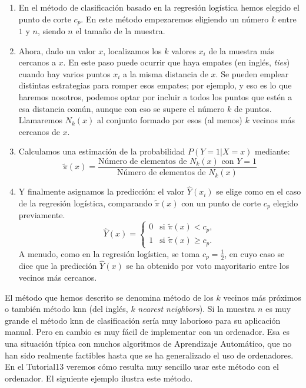 \begin{enumerate}
	\item En el método de clasificación basado en la regresión logística  hemos elegido el punto de corte $c_p$. En este método empezaremos eligiendo un número $k$ entre $1$ y $n$, siendo $n$ el tamaño de la muestra.
	
	\item Ahora, dado un valor $x$, localizamos los $k$ valores $x_i$ de la muestra más cercanos a $x$. En este paso puede ocurrir que haya {\sf empates} (en inglés, {\em ties}) cuando hay varios puntos $x_i$ a la misma distancia de $x$. Se pueden emplear distintas estrategias para romper esos empates; por ejemplo, y eso es lo que haremos nosotros, podemos optar por incluir a todos los puntos que estén a esa distancia común, aunque con eso se supere el número $k$ de puntos. Llamaremos $N_k(x)$ al conjunto formado por esos (al menos) $k$ vecinos más cercanos de $x$.

	\item Calculamos una estimación de la probabilidad $P(Y=1|X=x)$ mediante:
	\[
	\tilde{\pi}(x) =
	\dfrac{
		\mbox{Número de elementos de $N_k(x)$ con $Y=1$}
	}{
	\mbox{Número de elementos de $N_k(x)$}
	}
	\]
		
	\item Y finalmente asignamos la predicción: el valor $\hat{Y}(x_i)$ se elige como en el caso de la regresión logística, comparando $\tilde{\pi}(x)$  con un punto de corte $c_p$ elegido previamente.
	\[
	\hat Y(x) =
	\begin{cases}
	0 &\mbox{si } \tilde{\pi}(x) < c_p,\\[3mm]
	1 &\mbox{si } \tilde{\pi}(x) \geq c_p.
	\end{cases}
	\]
	A menudo, como en la regresión logística, se toma $c_p= \frac{1}{2}$, en cuyo caso se dice que la predicción $\hat{Y}(x)$ se ha obtenido por voto mayoritario entre los vecinos más cercanos.

\end{enumerate}
El método que hemos descrito se denomina {\sf método de los $k$ vecinos más próximos} o también {\sf método knn} (del inglés, $k$ {\em nearest neighbors}). Si la muestra $n$ es muy grande el método knn de clasificación sería muy laborioso para su aplicación manual. Pero en cambio es muy fácil de implementar con un ordenador. Esa es una situación típica con muchos algoritmos de Aprendizaje Automático, que no han sido realmente factibles hasta que se ha generalizado el uso de ordenadores. En el Tutorial13 veremos cómo resulta muy sencillo usar este método con el ordenador. El siguiente ejemplo ilustra este método.

